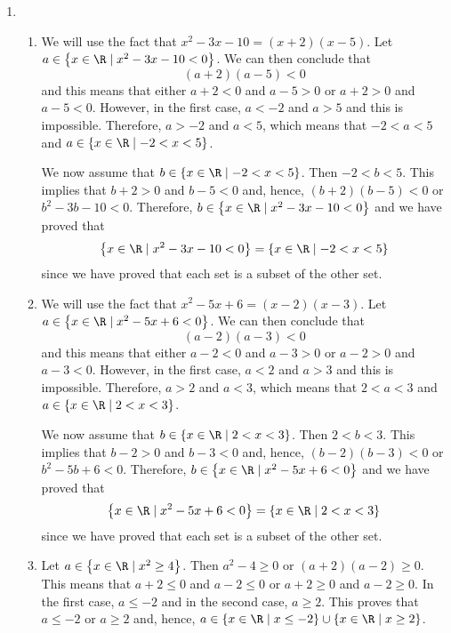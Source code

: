 \begin{enumerate}
\item \begin{enumerate}
\item We will use the fact that $x^2 - 3x - 10 = (x + 2)(x - 5)$.  Let 
$a \in \left\{x \in \R \mid x^2 - 3x - 10 < 0 \right\}$.  We can then conclude that 
\[
(a + 2)(a - 5) < 0
\]
and this means that either $a + 2 < 0$ and $a - 5 > 0$ or 
$a + 2 > 0$ and $a - 5 < 0$.  However, in the first case, $a < -2$ and $a > 5$ and this is  impossible.  Therefore, $a > -2$ and $a < 5$, which means that $-2 < a < 5$ and 
$a \in \left\{ x \in \R \mid -2 < x < 5 \right\}$.  

We now assume that 
$b \in \left\{ x \in \R \mid -2 < x < 5 \right\}$.  Then $-2 < b < 5$.  This implies that 
$b + 2 > 0$ and $b - 5 < 0$ and, hence, $(b + 2)(b - 5) < 0$ or $b^2 - 3b - 10 < 0$.  Therefore, 
$b \in \left\{x \in \R \mid x^2 - 3x - 10 < 0 \right\}$ and we have proved that 
\[
\left\{x \in \R \mid x^2 - 3x - 10 < 0 \right\} = \left\{ x \in \R \mid -2 < x < 5 \right\}
\]
since we have proved that each set is a subset of the other set.

\item We will use the fact that $x^2 - 5x + 6 = (x - 2)(x - 3)$.  Let 
$a \in \left\{x \in \R \mid x^2 - 5x + 6 < 0 \right\}$.  We can then conclude that 
\[
(a - 2)(a - 3) < 0
\]
and this means that either $a - 2 < 0$ and $a - 3 > 0$ or 
$a - 2 > 0$ and $a - 3 < 0$.  However, in the first case, $a < 2$ and $a > 3$ and this is  impossible.  Therefore, $a > 2$ and $a < 3$, which means that $2 < a < 3$ and 
$a \in \left\{ x \in \R \mid 2 < x < 3 \right\}$.  

We now assume that 
$b \in \left\{ x \in \R \mid 2 < x < 3 \right\}$.  Then $2 < b < 3$.  This implies that 
$b - 2 > 0$ and $b - 3 < 0$ and, hence, $(b - 2)(b - 3) < 0$ or $b^2 - 5b + 6 < 0$.  Therefore, 
$b \in \left\{x \in \R \mid x^2 - 5x + 6 < 0 \right\}$ and we have proved that 
\[
\left\{x \in \R \mid x^2 - 5x + 6 < 0 \right\} = \left\{ x \in \R \mid 2 < x < 3 \right\}
\]
since we have proved that each set is a subset of the other set.

\item Let $a \in \left\{x \in \R \mid x^2 \geq 4 \right\}$.  Then $a^2 - 4 \geq 0$ or 
$(a + 2)(a - 2) \geq 0$.  This means that $a + 2 \leq 0$ and $a - 2 \leq 0$ or $a + 2 \geq 0$ and 
$a - 2 \geq 0$.  In the first case, $a \leq -2$ and in the second case, $a \geq 2$. This proves that $a \leq -2$ or $a \geq 2$ and, hence, 
$a \in \left\{x \in \R \mid x \leq -2 \right\} \cup \left\{x \in \R \mid x \geq 2 \right\}$.


\end{enumerate}
\end{enumerate}

